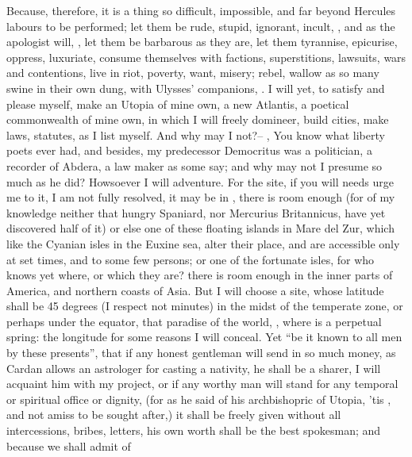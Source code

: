 Because, therefore, it is a thing so difficult, impossible, and far beyond
Hercules labours to be performed; let them be rude, stupid, ignorant, incult,
, and as the apologist will,
, let them be barbarous
as they are, let them tyrannise, epicurise, oppress,
luxuriate, consume themselves with factions, superstitions, lawsuits, wars and
contentions, live in riot, poverty, want, misery; rebel, wallow as so many
swine in their own dung, with Ulysses' companions, . I will yet, to satisfy and please myself, make an Utopia of mine
own, a new Atlantis, a poetical commonwealth of mine own, in which I will
freely domineer, build cities, make laws, statutes, as I list myself. And why
may I not?-- , \etc{} You know
what liberty poets ever had, and besides, my predecessor Democritus was a
politician, a recorder of Abdera, a law maker as some say; and why may not I
presume so much as he did? Howsoever I will adventure. For the site, if you
will needs urge me to it, I am not fully resolved, it may be in , there is room enough (for of my knowledge neither that
hungry Spaniard, nor Mercurius Britannicus, have yet
discovered half of it) or else one of these floating islands in Mare del Zur,
which like the Cyanian isles in the Euxine sea, alter their place, and are
accessible only at set times, and to some few persons; or one of the fortunate
isles, for who knows yet where, or which they are? there is room enough in the
inner parts of America, and northern coasts of Asia. But I will choose a site,
whose latitude shall be 45 degrees (I respect not minutes) in the midst of the
temperate zone, or perhaps under the equator, that paradise
of the world, , \etc{} where is a perpetual
spring: the longitude for some reasons I will conceal. Yet \enquote{be it known to all
men by these presents}, that if any honest gentleman will send in so much
money, as Cardan allows an astrologer for casting a nativity, he shall be a
sharer, I will acquaint him with my project, or if any worthy man will stand
for any temporal or spiritual office or dignity, (for as he said of his
archbishopric of Utopia, 'tis , and not amiss to be sought
after,) it shall be freely given without all intercessions, bribes, letters,
\etc{} his own worth shall be the best spokesman; and because we shall admit of
